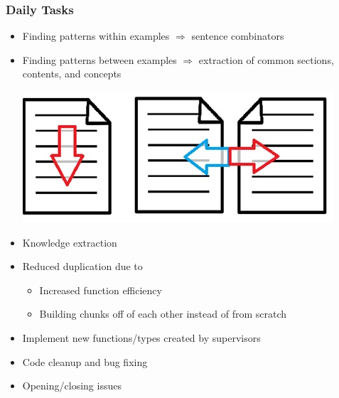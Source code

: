 \documentclass{beamer}
\begin{document}
\begin{frame}
\frametitle{Daily Tasks}
\begin{itemize}
 \item Finding patterns within examples $\Rightarrow$ sentence combinators
 \item Finding patterns between examples $\Rightarrow$ extraction of common sections, contents, and concepts
 \begin{center}
  \includegraphics[scale=0.6]{WinAndBwExamples.jpg}
 \end{center}
 \item Knowledge extraction
 \item Reduced duplication due to
  \begin{itemize}
   \item Increased function efficiency
   \item Building chunks off of each other instead of from scratch
  \end{itemize}
 \item<1-> Implement new functions/types created by supervisors
 \item<2-> Code cleanup and bug fixing
 \item<3-> Opening/closing issues
\end{itemize}
\end{frame}
\end{document}
